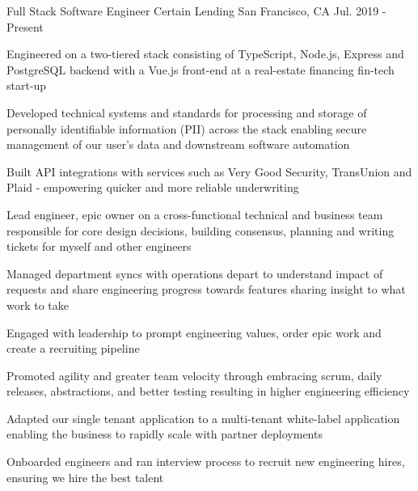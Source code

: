 






\begin{cventries}

  \cventry
     {Full Stack Software Engineer}
     {Certain Lending}
     {San Francisco, CA}
     {Jul. 2019 - Present}
     {
       \begin{cvitems}
			\item{Engineered on a two-tiered stack consisting of TypeScript, Node.js, Express and PostgreSQL backend with a Vue.js front-end at a real-estate financing fin-tech start-up}
			\item{Developed technical systems and standards for processing and storage of personally identifiable information (PII) across the stack enabling secure management of our user's data and downstream software automation}
			\item{Built API integrations with services such as Very Good Security, TransUnion and Plaid - empowering quicker and more reliable underwriting}
   		\item{Lead engineer, epic owner on a cross-functional technical and business team responsible for core design decisions, building consensus, planning and writing tickets for myself and other engineers}
      \item{Managed department syncs with operations depart to understand impact of requests and share engineering progress towards features sharing insight to what work to take}
      \item{Engaged with leadership to prompt engineering values, order epic work and create a recruiting pipeline}
  		\item{Promoted agility and greater team velocity through embracing scrum, daily releases, abstractions, and better testing resulting in higher engineering efficiency}
   		\item{Adapted our single tenant application to a multi-tenant white-label application enabling the business to rapidly scale with partner deployments}
      \item{Onboarded engineers and ran interview process to recruit new engineering hires, ensuring we hire the best talent}

\end{cvitems}}
\end{cventries}
